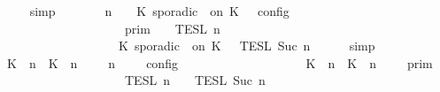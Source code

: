 \begin{isabellebody}
\ \ \ \ \isamarkupfalse%
\ simp\isanewline
\ \ \isamarkupfalse%
\ \isamarkupfalse%
\ {\isacartoucheopen}{\isasymlbrakk}\ {\isasymGamma}{\isacharcomma}\ n\ {\isasymturnstile}\ {\isasymPsi}\ {\isasymtriangleright}\ {\isacharparenleft}{\isacharparenleft}K\ sporadic\ {\isasymtau}\ on\ K\ {\isacharhash}\ {\isasymPhi}{\isacharparenright}\ {\isasymrbrakk}\isactrlsub c\isactrlsub o\isactrlsub n\isactrlsub f\isactrlsub i\isactrlsub g\isanewline
\ \ \ \ \ \ \ \ \ \ \ \ \ \ \ \ \ {\isacharequal}\ \ {\isasymlbrakk}{\isasymlbrakk}\ {\isasymGamma}\ {\isasymrbrakk}{\isasymrbrakk}\isactrlsub p\isactrlsub r\isactrlsub i\isactrlsub m\ {\isasyminter}\ {\isasymlbrakk}{\isasymlbrakk}\ {\isasymPsi}\ {\isasymrbrakk}{\isasymrbrakk}\isactrlsub T\isactrlsub E\isactrlsub S\isactrlsub L\isactrlbsup {\isasymge}\ n\isactrlesup \isanewline
\ \ \ \ \ \ \ \ \ \ \ \ \ \ \ \ \ \ {\isasyminter}\ {\isasymlbrakk}{\isasymlbrakk}\ {\isacharparenleft}K\ sporadic\ {\isasymtau}\ on\ K\ {\isacharhash}\ {\isasymPhi}\ {\isasymrbrakk}{\isasymrbrakk}\isactrlsub T\isactrlsub E\isactrlsub S\isactrlsub L\isactrlbsup {\isasymge}\ Suc\ n\isactrlesup {\isacartoucheclose}\isanewline
\ \ \ \ \isamarkupfalse%
\ simp\isanewline
\ \ \isamarkupfalse%
\ \isamarkupfalse%
\ {\isacartoucheopen}{\isasymlbrakk}\ {\isacharparenleft}{\isacharparenleft}K\ {\isasymUp}\ n{\isacharparenright}\ {\isacharhash}\ {\isacharparenleft}K\ {\isasymDown}\ n\ {\isacharat}\ {\isasymtau}{\isacharparenright}\ {\isacharhash}\ {\isasymGamma}{\isacharparenright}{\isacharcomma}\ n\ {\isasymturnstile}\ {\isasymPsi}\ {\isasymtriangleright}\ {\isasymPhi}\ {\isasymrbrakk}\isactrlsub c\isactrlsub o\isactrlsub n\isactrlsub f\isactrlsub i\isactrlsub g\isanewline
\ \ \ \ \ \ \ \ \ \ \ \ \ \ \ \ \ {\isacharequal}\ \ {\isasymlbrakk}{\isasymlbrakk}\ {\isacharparenleft}{\isacharparenleft}K\ {\isasymUp}\ n{\isacharparenright}\ {\isacharhash}\ {\isacharparenleft}K\ {\isasymDown}\ n\ {\isacharat}\ {\isasymtau}{\isacharparenright}\ {\isacharhash}\ {\isasymGamma}{\isacharparenright}\ {\isasymrbrakk}{\isasymrbrakk}\isactrlsub p\isactrlsub r\isactrlsub i\isactrlsub m\isanewline
\ \ \ \ \ \ \ \ \ \ \ \ \ \ \ \ \ \ {\isasyminter}\ {\isasymlbrakk}{\isasymlbrakk}\ {\isasymPsi}\ {\isasymrbrakk}{\isasymrbrakk}\isactrlsub T\isactrlsub E\isactrlsub S\isactrlsub L\isactrlbsup {\isasymge}\ n\isactrlesup \ {\isasyminter}\ {\isasymlbrakk}{\isasymlbrakk}\ {\isasymPhi}\ {\isasymrbrakk}{\isasymrbrakk}\isactrlsub T\isactrlsub E\isactrlsub S\isactrlsub L\isactrlbsup {\isasymge}\ Suc\ n\isactrlesup {\isacartoucheclose}\isanewline

\end{isabellebody}
